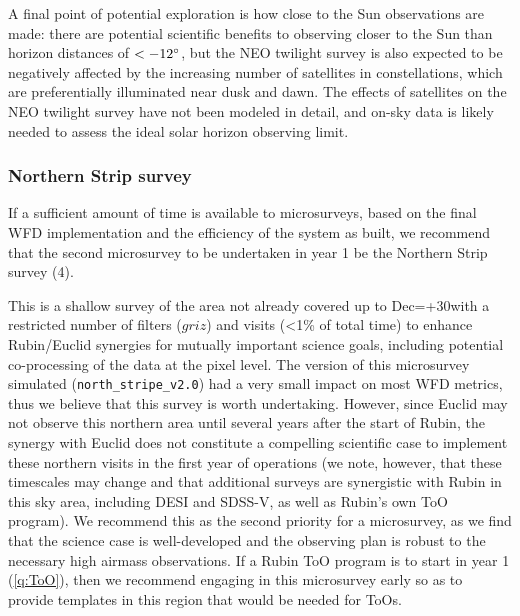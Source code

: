 A final point of potential exploration is how close to the Sun observations are made: there are potential scientific benefits to observing closer to the Sun than horizon distances of $< -12 ^{\circ}$, but the NEO twilight survey is also expected to be negatively affected by the increasing number of satellites in constellations, which are preferentially illuminated near dusk and dawn. The effects of satellites on the NEO twilight survey have not been modeled in detail, and on-sky data is likely needed to assess the ideal solar horizon observing limit. %


\subsubsection{Northern Strip survey}
If a sufficient amount of time is available to microsurveys, based on the final WFD implementation and the efficiency of the system as built, we recommend that the second microsurvey to be undertaken in year 1 be {the Northern Strip survey (4)}.

This is a shallow survey of the area not already covered up to Dec=+30\degree with a restricted number of filters ($griz$) and visits (<1\% of total time) to enhance Rubin/Euclid synergies for mutually important science goals, including potential co-processing of the data at the pixel level. The version of this microsurvey simulated (\texttt{north\_stripe\_v2.0}) had a very small impact on most WFD metrics, thus we believe that this survey is worth undertaking. However, since Euclid may not observe this northern area until several years after the start of Rubin, the synergy with Euclid does not constitute a compelling scientific case to implement these northern visits in the first year of operations (we note, however, that these timescales may change and that additional surveys are synergistic with Rubin in this sky area, including DESI and SDSS-V, as well as Rubin's own ToO program). We recommend this as the second priority for a microsurvey, as we find that the science case is well-developed and the observing plan is robust to the necessary high airmass observations. If a Rubin ToO program is to start in year 1 (\autoref{q:ToO}), then we recommend engaging in this microsurvey early so as to provide templates in this region that would be needed for ToOs.

